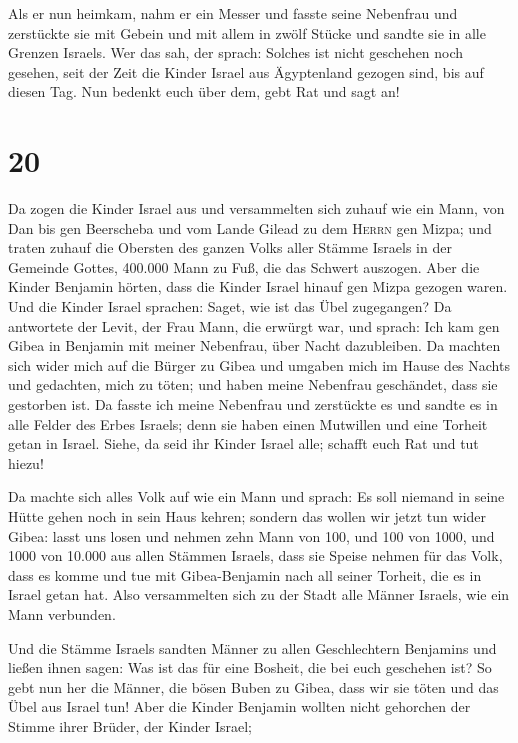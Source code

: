  Als er nun heimkam, nahm er ein Messer und fasste seine
Nebenfrau und zerstückte sie mit Gebein und mit allem in zwölf Stücke
und sandte sie in alle Grenzen Israels.  Wer das sah, der
sprach: Solches ist nicht geschehen noch gesehen, seit der Zeit die
Kinder Israel aus Ägyptenland gezogen sind, bis auf diesen Tag. Nun
bedenkt euch über dem, gebt Rat und sagt an!

\hypertarget{section-19}{%
\section{20}\label{section-19}}

 Da zogen die Kinder Israel aus und versammelten sich
zuhauf wie ein Mann, von Dan bis gen Beerscheba und vom Lande Gilead zu
dem \textsc{Herrn} gen Mizpa;  und traten zuhauf die
Obersten des ganzen Volks aller Stämme Israels in der Gemeinde Gottes,
400.000 Mann zu Fuß, die das Schwert auszogen.  Aber die
Kinder Benjamin hörten, dass die Kinder Israel hinauf gen Mizpa gezogen
waren. Und die Kinder Israel sprachen: Saget, wie ist das Übel
zugegangen?  Da antwortete der Levit, der Frau Mann, die
erwürgt war, und sprach: Ich kam gen Gibea in Benjamin mit meiner
Nebenfrau, über Nacht dazubleiben.  Da machten sich wider
mich auf die Bürger zu Gibea und umgaben mich im Hause des Nachts und
gedachten, mich zu töten; und haben meine Nebenfrau geschändet, dass sie
gestorben ist.  Da fasste ich meine Nebenfrau und
zerstückte es und sandte es in alle Felder des Erbes Israels; denn sie
haben einen Mutwillen und eine Torheit getan in Israel. 
Siehe, da seid ihr Kinder Israel alle; schafft euch Rat und tut hiezu!

 Da machte sich alles Volk auf wie ein Mann und sprach: Es
soll niemand in seine Hütte gehen noch in sein Haus kehren;
 sondern das wollen wir jetzt tun wider Gibea:
 lasst uns losen und nehmen zehn Mann von 100, und 100
von 1000, und 1000 von 10.000 aus allen Stämmen Israels, dass sie Speise
nehmen für das Volk, dass es komme und tue mit Gibea-Benjamin nach all
seiner Torheit, die es in Israel getan hat.  Also
versammelten sich zu der Stadt alle Männer Israels, wie ein Mann
verbunden.

 Und die Stämme Israels sandten Männer zu allen
Geschlechtern Benjamins und ließen ihnen sagen: Was ist das für eine
Bosheit, die bei euch geschehen ist?  So gebt nun her die
Männer, die bösen Buben zu Gibea, dass wir sie töten und das Übel aus
Israel tun! Aber die Kinder Benjamin wollten nicht gehorchen der Stimme
ihrer Brüder, der Kinder Israel;

